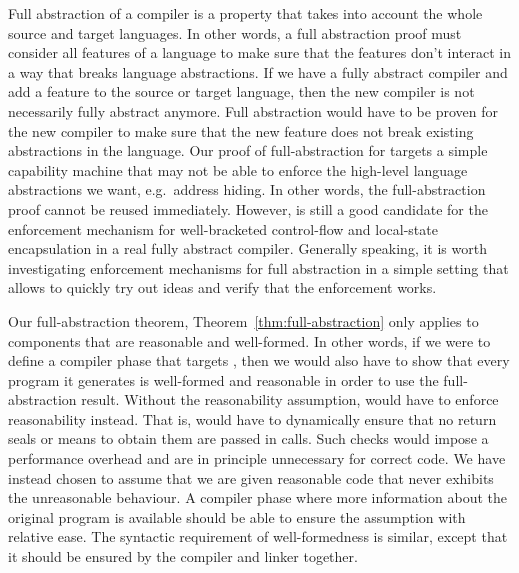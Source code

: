 \begin{jversion}
  Full abstraction of a compiler is a property that takes into account the whole source and target languages.
  In other words, a full abstraction proof must consider all features of a language to make sure that the features don't interact in a way that breaks language abstractions.
  If we have a fully abstract compiler and add a feature to the source or target language, then the new compiler is not necessarily fully abstract anymore.
  Full abstraction would have to be proven for the new compiler to make sure that the new feature does not break existing abstractions in the language.
  Our proof of full-abstraction for \stktokens{} targets a simple capability machine that may not be able to enforce the high-level language abstractions we want, e.g.\ address hiding.
  In other words, the full-abstraction proof cannot be reused immediately.
  However, \stktokens{} is still a good candidate for the enforcement mechanism for well-bracketed control-flow and local-state encapsulation in a real fully abstract compiler.
  Generally speaking, it is worth investigating enforcement mechanisms for full abstraction in a simple setting that allows to quickly try out ideas and verify that the enforcement works.

  Our full-abstraction theorem, Theorem~\ref{thm:full-abstraction} only applies to components that are reasonable and well-formed.
  In other words, if we were to define a compiler phase that targets \srccm{}, then we would also have to show that every program it generates is well-formed and reasonable in order to use the full-abstraction result.
  Without the reasonability assumption, \stktokens{} would have to enforce reasonability instead.
  That is, \stktokens{} would have to dynamically ensure that no return seals or means to obtain them are passed in calls.
  Such checks would impose a performance overhead and are in principle unnecessary for correct code.
  We have instead chosen to assume that we are given reasonable code that never exhibits the unreasonable behaviour.
  A compiler phase where more information about the original program is available should be able to
  ensure the assumption with relative ease.
  The syntactic requirement of well-formedness is similar, except that it should be ensured by the
  compiler and linker together.


\end{jversion}
